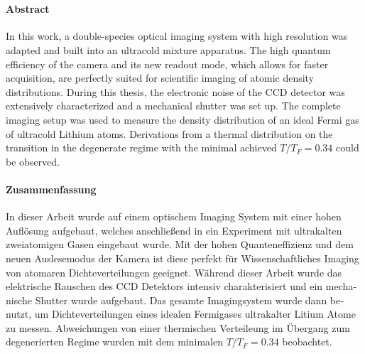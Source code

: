 \cleardoublepage
\thispagestyle{plain}

\makeatletter
\begin{center}
	\large\textbf{\@title}\\
	\normalsize\@author
\end{center}
\makeatother

\paragraph{Abstract}
In this work, a double-species optical imaging system with high resolution was adapted and built into an ultracold mixture apparatus. The high quantum efficiency of the camera and its new readout mode, which allows for faster acquisition, are perfectly suited for scientific imaging of atomic density distributions. During this thesis, the electronic noise of the CCD detector was extensively characterized and a mechanical shutter was set up. The complete imaging setup was used to measure the density distribution of an ideal Fermi gas of ultracold Lithium atoms. Derivations from a thermal distribution on the transition in the degenerate regime with the minimal achieved $T/T_F=0.34$ could be observed.


\begin{otherlanguage}{ngerman}

\paragraph{Zusammenfassung}
In dieser Arbeit wurde auf einem optischem Imaging System mit einer hohen Auflösung aufgebaut, welches anschließend in ein Experiment mit ultrakalten zweiatomigen Gasen eingebaut wurde. Mit der hohen Quanteneffizienz und dem neuen Auslesemodus der Kamera ist diese perfekt für Wissenschaftliches Imaging von atomaren Dichteverteilungen geeignet. Während dieser Arbeit wurde das elektrische Rauschen des CCD Detektors intensiv charakterisiert und ein mechanische Shutter wurde aufgebaut. Das gesamte Imagingsystem wurde dann benutzt, um Dichteverteilungen eines idealen Fermigases ultrakalter Litium Atome zu messen. Abweichungen von einer thermischen Verteileung im Übergang zum degenerierten Regime wurden mit dem minimalen $T/T_F=0.34$ beobachtet.

\end{otherlanguage}
